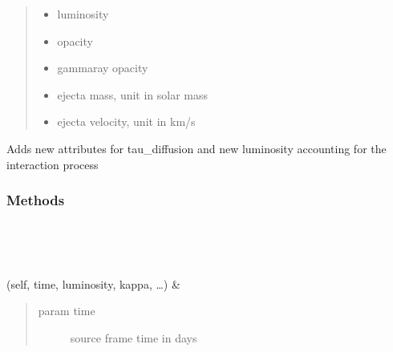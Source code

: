 \documentclass[letterpaper,10pt,english]{sphinxmanual}
\begin{document}
\begin{fulllineitems}
\begin{fulllineitems}
\begin{quote}
\begin{description}
\begin{itemize}
\item {} 
 \textendash{} luminosity

\item {} 
 \textendash{} opacity

\item {} 
 \textendash{} gamma\sphinxhyphen{}ray opacity

\item {} 
 \textendash{} ejecta mass, unit in solar mass

\item {} 
 \textendash{} ejecta velocity, unit in km/s

\end{itemize}

\end{description}\end{quote}

Adds new attributes for tau\_diffusion and new luminosity accounting for the interaction process

\end{fulllineitems}

\subsubsection*{Methods}


\begin{savenotes}\sphinxatlongtablestart\begin{longtable}[c]{}
\hline

\endfirsthead

%
{}\\
\hline

\endhead

\hline
{}\\
\endfoot

\endlastfoot

{\hyperref[\detokenize{generated/sdapy.interaction_processes.Diffusion:sdapy.interaction_processes.Diffusion.__init__}]{}}(self, time, luminosity, kappa, …)
&
\begin{quote}\begin{description}
\item[{param time}] \leavevmode
source frame time in days


\end{description}
\end{quote}
\end{longtable}
\end{savenotes}
\end{fulllineitems}
\end{document}
